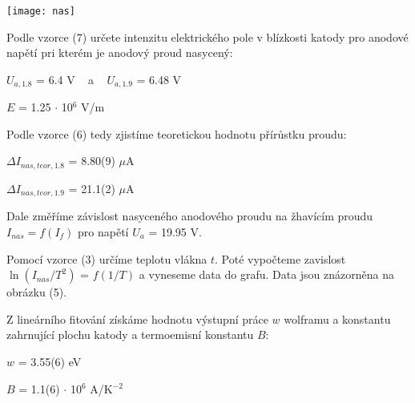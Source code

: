 \documentclass[a4paper,11pt]{article}
\begin{document}
\newpage
    \begin{minipage}[t]{0.5\textwidth}
                \vspace{10pt}           
                \par \centering
                \texttt{[image: nas]}
                \captionsetup{justification=centering, font=footnotesize}
                \label{fig:dif}
                \vspace{10pt}
                \raggedright 

                Podle vzorce (7) určete intenzitu elektrického pole v blízkosti katody pro anodové napětí pri kterém je anodový proud nasycený: 
                \begin{center}
                    $U_{a, 1.8}$ = 6.4 V ~ a ~ $U_{a, 1.9}$ = 6.48 V
                \end{center}
                \begin{center}
                    $E$ = 1.25 $\cdot$ 10$^6$ V/m
                \end{center}

                \par Podle vzorce (6) tedy zjistíme teoretickou hodnotu přírůstku proudu: 
                \begin{center}
                    $\Delta I_{nas, teor, 1.8}$ = 8.80(9) $\mu$A
                    \vspace{5pt}
                    \par $\Delta I_{nas, teor, 1.9}$ = 21.1(2) $\mu$A
                \end{center}
                
                Dale změříme závislost nasyceného anodového proudu na žhavícím proudu $I_{nas} = f(I_f)$ pro napětí $U_a$ = 19.95 V.
                \par Pomocí vzorce (3) určíme teplotu vlákna $t$. Poté vypočteme zavislost $\ln (I_{nas}/T^2)$ = $f(1/T)$ a vyneseme data do grafu. Data jsou znázorněna na obrázku (5). 
                \par Z lineárního fitování získáme hodnotu výstupní práce $w$ wolframu a konstantu zahrnující plochu katody a termoemisní konstantu $B$:
                \begin{center}
                    $w$ = 3.55(6) eV
                    \vspace{5pt}
                    \par $B$ = 1.1(6) $\cdot$ 10$^6$ A/K$^{-2}$
                \end{center}
    \end{minipage}
\end{document}
